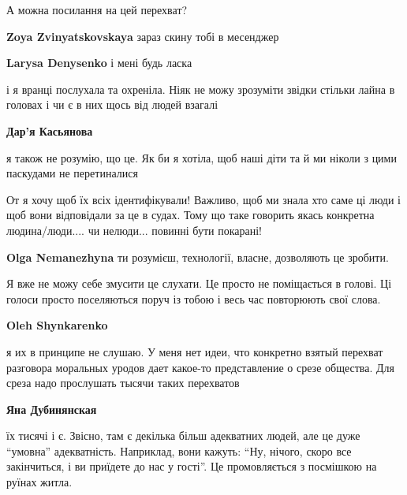 
 
 
 
 
\qqSecCmt

\begin{itemize} %
А можна посилання на цей перехват?

\textbf{Zoya Zvinyatskovskaya} зараз скину тобі в месенджер

\textbf{Larysa Denysenko} і мені будь ласка


і я вранці послухала та охреніла. Ніяк не можу зрозуміти звідки стільки лайна в
головах і чи є в них щось від людей взагалі

\textbf{Дар'я Касьянова} 

я також не розумію, що це. Як би я хотіла, щоб наші діти та й ми ніколи з цими
паскудами не перетиналися


От я хочу щоб їх всіх ідентифікували! Важливо, щоб ми знала хто саме ці люди і
щоб вони відповідали за це в судах. Тому що таке говорить якась конкретна
людина/люди.... чи нелюди... повинні бути покарані!

\textbf{Olga Nemanezhyna} ти розумієш, технології, власне, дозволяють це зробити.


Я вже не можу себе змусити це слухати. Це просто не поміщається в голові. Ці
голоси просто поселяються поруч із тобою і весь час повторюють свої слова.

\begin{itemize} %
\textbf{Oleh Shynkarenko} 

я их в принципе не слушаю. У меня нет идеи, что конкретно взятый перехват
разговора моральных уродов дает какое-то представление о срезе общества. Для
среза надо прослушать тысячи таких перехватов

\textbf{Яна Дубинянская} 

їх тисячі і є. Звісно, там є декілька більш адекватних людей, але це дуже
\enquote{умовна} адекватність. Наприклад, вони кажуть: \enquote{Ну, нічого, скоро все
закінчиться, і ви приїдете до нас у гості}. Це промовляється з посмішкою на
руїнах житла.


\end{itemize}
\end{itemize}
